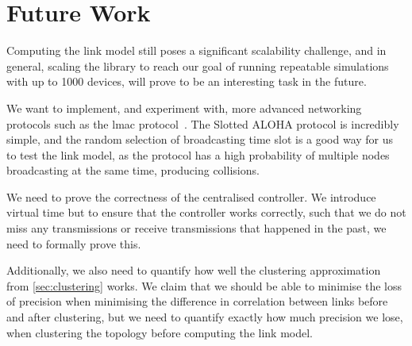 \section{Future Work}\label{sec:futurework}
Computing the link model still poses a significant scalability challenge, and in general, scaling the library to reach our goal of running repeatable simulations with up to 1000 devices, will prove to be an interesting task in the future.\smallbreak

We want to implement, and experiment with, more advanced networking protocols such as the \gls{lmac} protocol~\cite{paper:lmac_protocol}. The Slotted ALOHA protocol is incredibly simple, and the random selection of broadcasting time slot is a good way for us to test the link model, as the protocol has a high probability of multiple nodes broadcasting at the same time, producing collisions.\smallbreak

We need to prove the correctness of the centralised controller. We introduce virtual time but to ensure that the controller works correctly, such that we do not miss any transmissions or receive transmissions that happened in the past, we need to formally prove this.\smallbreak

Additionally, we also need to quantify how well the clustering approximation from \autoref{sec:clustering} works. We claim that we should be able to minimise the loss of precision when minimising the difference in correlation between links before and after clustering, but we need to quantify exactly how much precision we lose, when clustering the topology before computing the link model.


